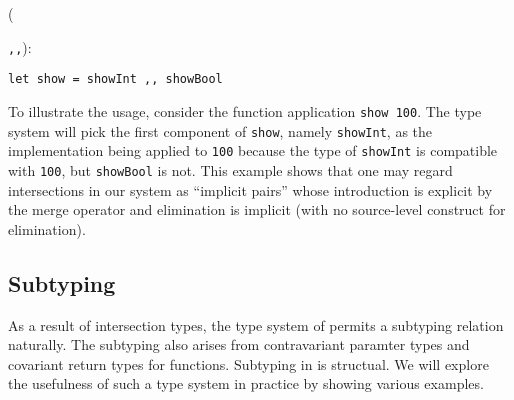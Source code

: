 ({\lstinline{,,}):
\begin{lstlisting}
let show = showInt ,, showBool
\end{lstlisting}

To illustrate the usage, consider the function application \lstinline{show 100}.
The type system will pick the first component of \lstinline{show}, namely
\lstinline{showInt}, as the implementation being applied to \lstinline{100}
because the type of \lstinline{showInt} is compatible with \lstinline{100}, but
\lstinline{showBool} is not. This example shows that one may regard
intersections in our system as ``implicit pairs'' whose introduction is explicit
by the merge operator and elimination is implicit (with no source-level
construct for elimination).








\subsection{Subtyping}
As a result of intersection types, the type system of \name permits a subtyping
relation naturally. The subtyping also arises from contravariant paramter types
and covariant return types for functions. Subtyping in \name is structual. We
will explore the usefulness of such a type system in practice by showing various
examples.

}
